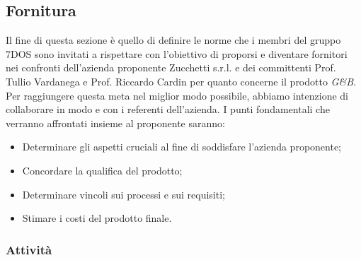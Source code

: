 \subsection{Fornitura}
Il fine di questa sezione è quello di definire le norme che i membri del gruppo 7DOS sono invitati a rispettare con l'obiettivo di proporsi e diventare fornitori nei confronti dell'azienda proponente Zucchetti s.r.l. e dei committenti Prof. Tullio Vardanega e Prof. Riccardo Cardin per quanto concerne il prodotto \emph{G\&B}.
Per raggiungere questa meta nel miglior modo possibile, abbiamo intenzione di collaborare in modo  e  con i referenti dell'azienda.
I punti fondamentali che verranno affrontati insieme al proponente saranno:
\begin{itemize}
\item Determinare gli aspetti cruciali al fine di soddisfare l'azienda proponente;
\item Concordare la qualifica del prodotto;
\item Determinare vincoli sui processi e sui requisiti;
\item Stimare i costi del prodotto finale.
\end{itemize}
\subsubsection{Attività}
